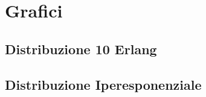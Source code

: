 \chapter{Grafici} 
\label{appendix:grafici}
\section{Distribuzione 10 Erlang}
\begin{comment}
\begin{figure}[H]
	\begin{center}
	\texttt{[image: grafici\_10-Erlang/AverageResponseTime.png]}
	\caption[Tempo di risposta del sistema senza Overload Management (Legge Front-End:10 Erlang)]{Tempo di risposta del sistema senza Overload Management (Legge Front-End:10 Erlang).}
	\label{fig:exp_res_time}
	\end{center}
\end{figure}

\begin{figure}[H]
	\begin{center}
	\texttt{[image: grafici\_10-Erlang/ThroughputSessions.png]}
	\caption[Throughput del sistema senza Overload Management (Legge Front-End:10 Erlang)]{Throughput del sistema senza Overload Management (Legge Front-End:10 Erlang).}
	\label{fig:exp_res_time}
	\end{center}
\end{figure}
\end{comment}
\section{Distribuzione Iperesponenziale}
\begin{comment}
\begin{figure}[H]
	\begin{center}
	\texttt{[image: grafici\_Hyperexponential/AverageResponseTime.png]}
	\caption[Tempo di risposta del sistema senza Overload Management (Legge Front-End:Iperesponenziale)]{Tempo di risposta del sistema senza Overload Management (Legge Front-End:Iperesponenziale).}
	\label{fig:exp_res_time}
	\end{center}
\end{figure}

\begin{figure}[H]
	\begin{center}
	\texttt{[image: grafici\_Hyperexponential/ThroughputSessions.png]}
	\caption[Throughput del sistema senza Overload Management (Legge Front-End:Iperesponenziale)]{Throughput del sistema senza Overload Management (Legge Front-End:Iperesponenziale).}
	\label{fig:exp_res_time}
	\end{center}
\end{figure}
\end{comment}
